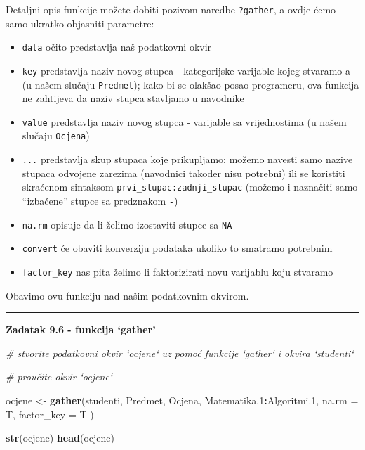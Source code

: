 \documentclass[]{book}
\newenvironment{Shaded}{\begin{snugshade}}{\end{snugshade}}
\newcommand{\KeywordTok}[1]{\textcolor[rgb]{0.13,0.29,0.53}{\textbf{#1}}}
\newcommand{\DataTypeTok}[1]{\textcolor[rgb]{0.13,0.29,0.53}{#1}}
\newcommand{\DecValTok}[1]{\textcolor[rgb]{0.00,0.00,0.81}{#1}}
\newcommand{\StringTok}[1]{\textcolor[rgb]{0.31,0.60,0.02}{#1}}
\newcommand{\CommentTok}[1]{\textcolor[rgb]{0.56,0.35,0.01}{\textit{#1}}}
\newcommand{\OperatorTok}[1]{\textcolor[rgb]{0.81,0.36,0.00}{\textbf{#1}}}
\newcommand{\NormalTok}[1]{#1}
\providecommand{\tightlist}{%
  \setlength{\itemsep}{0pt}\setlength{\parskip}{0pt}}
\theoremstyle{definition}
\theoremstyle{definition}
\theoremstyle{definition}
\theoremstyle{remark}
\begin{document}
Detaljni opis funkcije možete dobiti pozivom naredbe \texttt{?gather}, a
ovdje ćemo samo ukratko objasniti parametre:

\begin{itemize}
\tightlist
\item
  \texttt{data} očito predstavlja naš podatkovni okvir
\item
  \texttt{key} predstavlja naziv novog stupca - kategorijske varijable
  kojeg stvaramo a (u našem slučaju \texttt{Predmet}); kako bi se
  olakšao posao programeru, ova funkcija ne zahtijeva da naziv stupca
  stavljamo u navodnike
\item
  \texttt{value} predstavlja naziv novog stupca - varijable sa
  vrijednostima (u našem slučaju \texttt{Ocjena})
\item
  \texttt{...} predstavlja skup stupaca koje prikupljamo; možemo navesti
  samo nazive stupaca odvojene zarezima (navodnici također nisu
  potrebni) ili se koristiti skraćenom sintaksom
  \texttt{prvi\_stupac:zadnji\_stupac} (možemo i naznačiti samo
  ``izbačene'' stupce sa predznakom \texttt{-})
\item
  \texttt{na.rm} opisuje da li želimo izostaviti stupce sa \texttt{NA}
\item
  \texttt{convert} će obaviti konverziju podataka ukoliko to smatramo
  potrebnim
\item
  \texttt{factor\_key} nas pita želimo li faktorizirati novu varijablu
  koju stvaramo
\end{itemize}

Obavimo ovu funkciju nad našim podatkovnim okvirom.

\begin{center}\rule{0.5\linewidth}{\linethickness}\end{center}

\textbf{Zadatak 9.6 - funkcija `gather'}

\begin{Shaded}
\begin{Highlighting}[]
\CommentTok{# stvorite podatkovni okvir `ocjene` uz pomoć funkcije `gather` i okvira `studenti`}


\CommentTok{# proučite okvir `ocjene`}
\end{Highlighting}
\end{Shaded}

\begin{Shaded}
\begin{Highlighting}[]
\NormalTok{ocjene <-}\StringTok{ }\KeywordTok{gather}\NormalTok{(studenti, Predmet, Ocjena, Matematika.}\DecValTok{1}\OperatorTok{:}\NormalTok{Algoritmi.}\DecValTok{1}\NormalTok{, }\DataTypeTok{na.rm =}\NormalTok{ T, }\DataTypeTok{factor_key =}\NormalTok{ T )}

\KeywordTok{str}\NormalTok{(ocjene)}
\KeywordTok{head}\NormalTok{(ocjene)}
\end{Highlighting}
\end{Shaded}
\end{document}
